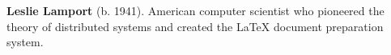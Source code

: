 \textbf{Leslie Lamport} (b. 1941). American computer scientist who pioneered the theory of distributed systems and created the \LaTeX{} document preparation system.

